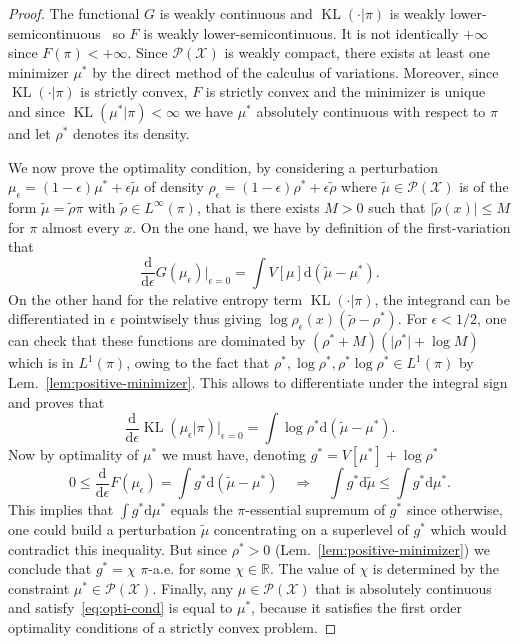 \documentclass[11pt]{article}
\newcommand{\RR}{\mathbb{R}}
\newcommand{\Pp}{\mathcal{P}}
\newcommand{\Xx}{\mathcal{X}}
\renewcommand{\d}{\mathrm{d}}
\DeclareMathOperator{\KL}{KL}
\begin{document}
\begin{proof}
The functional $G$ is weakly continuous and $\KL(\cdot|\pi)$ is weakly lower-semicontinuous~\cite[Sec.~7.1.2]{santambrogio2015optimal} so $F$ is weakly lower-semicontinuous. It is not identically $+\infty$ since $F(\pi)<+\infty$. Since $\Pp(\Xx)$ is weakly compact, there exists at least one minimizer $\mu^*$ by the direct method of the calculus of variations. Moreover, since $\KL(\cdot| \pi)$ is strictly convex, $F$ is strictly convex and the minimizer is unique and since $\KL(\mu^*|\pi)<\infty$ we have $\mu^*$ absolutely continuous with respect to $\pi$ and let $\rho^*$ denotes its density.

We now prove the optimality condition, by considering a perturbation $\mu_\epsilon = (1-\epsilon)\mu^*+\epsilon \tilde \mu$ of density $\rho_\epsilon = (1-\epsilon)\rho^*+\epsilon \tilde \rho$ where $\tilde \mu \in \Pp(\Xx)$ is of the form $\tilde \mu = \tilde \rho \pi$ with $\tilde \rho \in L^\infty(\pi)$, that is there exists $M>0$ such that $\vert \tilde \rho (x)\vert \leq M$ for $\pi$ almost every $x$. On the one hand, we have by definition of the first-variation that
$$
\frac{\d}{\d \epsilon} G(\mu_\epsilon)\vert_{\epsilon=0} = \int V[\mu]\d (\tilde \mu -\mu^*).
$$
On the other hand for the relative entropy term $\KL(\cdot|\pi)$, the integrand can be differentiated in $\epsilon$ pointwisely thus giving $\log \rho_\epsilon(x)(\tilde \rho-\rho^*)$. For $\epsilon<1/2$, one can check that these functions are dominated by $(\rho^*+M)(\vert \rho^*\vert +\log M)$ which is in $L^1(\pi)$, owing to the fact that $\rho^*, \log \rho^*,\rho^*\log\rho^* \in L^1(\pi)$ by Lem.~\ref{lem:positive-minimizer}. This allows to differentiate under the integral sign and proves that
$$
\frac{\d}{\d \epsilon} \KL(\mu_\epsilon| \pi)\vert_{\epsilon=0} = \int \log \rho^* \d (\tilde \mu -\mu^*).
$$
Now by optimality of $\mu^*$ we must have, denoting $g^*=V[\mu^*]+\log \rho^*$
$$
0 \leq \frac{\d}{\d \epsilon} F(\mu_\epsilon) = \int g^* \d (\tilde \mu -\mu^*) \quad\Rightarrow\quad \int g^*\d\tilde \mu \leq \int g^*\d\mu^*.
$$
This implies that $\int g^*\d\mu^*$ equals the $\pi$-essential supremum of $g^*$ since otherwise, one could build a perturbation $\tilde \mu$ concentrating on a superlevel of $g^*$ which would contradict this inequality. But since $\rho^*>0$ (Lem.~\ref{lem:positive-minimizer}) we conclude that $g^*=\chi$ $\pi$-a.e. for some $\chi \in \RR$. The value of $\chi$ is determined by the constraint $\mu^* \in \Pp(\Xx)$.
Finally, any $\mu\in \Pp(\Xx)$ that is absolutely continuous and satisfy~\eqref{eq:opti-cond} is equal to $\mu^*$, because it satisfies the first order optimality conditions of a strictly convex problem.
\end{proof}
\end{document}
